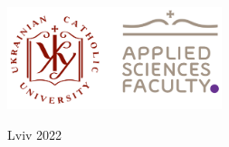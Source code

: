 \documentclass[
11pt, %
english, %
singlespacing, %
headsepline, %
openany
]{MastersDoctoralThesis} %
\begin{document}
\begin{titlepage}
\begin{center}
		\vfill
		\includegraphics[height=3cm]{UCU-Apps 2022.png} %

		\vfill
		{\large Lviv 2022}\\[4cm] %

		\vfill
	\end{center}
\end{titlepage}


%
%
%
%
{}
\end{document}
